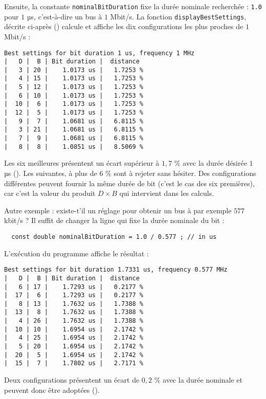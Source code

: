 Ensuite, la constante \texttt{nominalBitDuration} fixe la durée nominale recherchée : \texttt{1.0} pour $1$ µs, c'est-à-dire un bus à $1$ Mbit/s. La fonction \texttt{displayBestSettings}, décrite ci-après () calcule et affiche les dix configurations les plus proches de $1$ Mbit/s :

{\small\singlespacing
\begin{verbatim}
Best settings for bit duration 1 us, frequency 1 MHz
|   D |  B | Bit duration |  distance
|   3 | 20 |    1.0173 us |   1.7253 %
|   4 | 15 |    1.0173 us |   1.7253 %
|   5 | 12 |    1.0173 us |   1.7253 %
|   6 | 10 |    1.0173 us |   1.7253 %
|  10 |  6 |    1.0173 us |   1.7253 %
|  12 |  5 |    1.0173 us |   1.7253 %
|   9 |  7 |    1.0681 us |   6.8115 %
|   3 | 21 |    1.0681 us |   6.8115 %
|   7 |  9 |    1.0681 us |   6.8115 %
|   8 |  8 |    1.0851 us |   8.5069 %
\end{verbatim}
}

Les six meilleures présentent un écart supérieur à $1,7$ \% avec la durée désirée $1$ µs (\pasFini). Les suivantes, à plus de $6$ \% sont à rejeter sans hésiter. Des configurations différentes peuvent fournir la même durée de bit (c'est le cas des six premières), car c'est la valeur du produit $D\times B$ qui intervient dans les calculs. 

Autre exemple : existe-t'il un réglage pour obtenir un bus à par exemple $577$ kbit/s ? Il suffit de changer la ligne qui fixe la durée nominale du bit : 

\begin{lstlisting}
  const double nominalBitDuration = 1.0 / 0.577 ; // in us
\end{lstlisting}

L'exécution du programme affiche le résultat :
{\small\singlespacing
\begin{verbatim}
Best settings for bit duration 1.7331 us, frequency 0.577 MHz
|   D |  B | Bit duration |  distance
|   6 | 17 |    1.7293 us |   0.2177 %
|  17 |  6 |    1.7293 us |   0.2177 %
|   8 | 13 |    1.7632 us |   1.7388 %
|  13 |  8 |    1.7632 us |   1.7388 %
|   4 | 26 |    1.7632 us |   1.7388 %
|  10 | 10 |    1.6954 us |   2.1742 %
|   4 | 25 |    1.6954 us |   2.1742 %
|   5 | 20 |    1.6954 us |   2.1742 %
|  20 |  5 |    1.6954 us |   2.1742 %
|  15 |  7 |    1.7802 us |   2.7171 %
\end{verbatim}
}

Deux configurations présentent un écart de $0,2$ \% avec la durée nominale et peuvent donc être adoptées (\pasFini).








